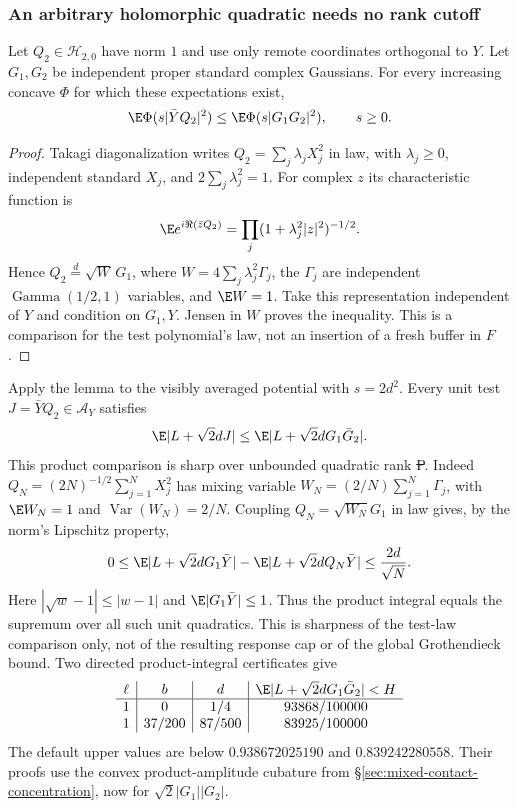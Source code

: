 \subsubsection{An arbitrary holomorphic quadratic needs no rank cutoff}
\begin{lemma}
\label{lem:quadratic-block-support}
Let $Q_2\in\mathcal H_{2,0}$ have norm $1$ and use only remote
coordinates orthogonal to $Y$. Let $G_1,G_2$ be independent proper
standard complex Gaussians. For every increasing concave $\Phi$ for
which these expectations exist,
\[
 \E\Phi(s|\bar YQ_2|^2)
       \le\E\Phi(s|G_1G_2|^2),\qquad s\ge0.
\]
\end{lemma}
\begin{proof}
Takagi diagonalization writes $Q_2=\sum_j\lambda_j X_j^2$ in law,
with $\lambda_j\ge0$, independent standard $X_j$, and
$2\sum_j\lambda_j^2=1$. For complex $z$ its characteristic function is
\[
 \E e^{i\Re(\bar zQ_2)}
       =\prod_j(1+\lambda_j^2|z|^2)^{-1/2}.
\]
Hence $Q_2\overset d=\sqrt W\,G_1$, where
$W=4\sum_j\lambda_j^2\Gamma_j$, the $\Gamma_j$ are independent
$\operatorname{Gamma}(1/2,1)$ variables, and $\E W=1$.
Take this representation independent of $Y$ and condition on $G_1,Y$.
Jensen in $W$ proves the inequality. This is a comparison for the
test polynomial's law, not an insertion of a fresh buffer in $F$.
\end{proof}

Apply the lemma to the visibly averaged potential with $s=2d^2$.
Every unit test $J=\bar YQ_2\in\mathcal A_Y$ satisfies
\[
 \E|L+\sqrt2dJ|\le\E|L+\sqrt2dG_1\bar G_2|.
\]
This product comparison is sharp over unbounded quadratic rank \st{P}.
Indeed $Q_N=(2N)^{-1/2}\sum_{j=1}^NX_j^2$ has mixing variable
$W_N=(2/N)\sum_{j=1}^N\Gamma_j$, with
$\E W_N=1$ and $\operatorname{Var}(W_N)=2/N$. Coupling
$Q_N=\sqrt{W_N}G_1$ in law gives, by the norm's Lipschitz property,
\[
 0\le \E|L+\sqrt2dG_1\bar Y|-\E|L+\sqrt2dQ_N\bar Y|
 \le\frac{2d}{\sqrt N}.
\]
Here $|\sqrt w-1|\le|w-1|$ and $\E|G_1\bar Y|\le1$.
Thus the product integral equals the supremum over all such unit
quadratics. This is sharpness of the test-law comparison only, not of
the resulting response cap or of the global Grothendieck bound.
Two directed product-integral certificates give
\[
\begin{array}{c|c|c|c}
 \ell&b&d&\E|L+\sqrt2dG_1\bar G_2|<H\\\hline
 1&0&1/4&93868/100000\\
 1&37/200&87/500&83925/100000
\end{array}
\]
The default upper values are below $0.938672025190$ and
$0.839242280558$. Their proofs use the convex product-amplitude
cubature from \S\ref{sec:mixed-contact-concentration}, now for
$\sqrt2|G_1||G_2|$.

